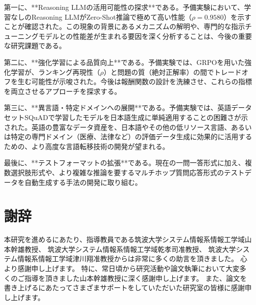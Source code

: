 \documentclass[a4paper,11pt]{jreport}
\begin{document}
第一に、**Reasoning LLMの活用可能性の探求**である。予備実験において、学習なしのReasoning LLMがZero-Shot推論で極めて高い性能（$\rho = 0.9580$）を示すことが確認された。この現象の背景にあるメカニズムの解明や、専門的な指示チューニングモデルとの性能差が生まれる要因を深く分析することは、今後の重要な研究課題である。

第二に、**強化学習による品質向上**である。予備実験では、GRPOを用いた強化学習が、ランキング再現性（$\rho$）と問題の質（絶対正解率）の間でトレードオフを生む可能性が示唆された。今後は報酬関数の設計を洗練させ、これらの指標を両立させるアプローチを探求する。

第三に、**異言語・特定ドメインへの展開**である。予備実験では、英語データセットSQuADで学習したモデルを日本語生成に単純適用することの困難さが示された。英語の豊富なデータ資産を、日本語やその他の低リソース言語、あるいは特定の専門ドメイン（医療、法律など）の評価データ生成に効果的に活用するための、より高度な言語転移技術の開発が望まれる。

最後に、**テストフォーマットの拡張**である。現在の一問一答形式に加え、複数選択肢形式や、より複雑な推論を要するマルチホップ質問応答形式のテストデータを自動生成する手法の開発に取り組む。

\chapter*{謝辞}
本研究を進めるにあたり、指導教員である筑波大学システム情報系情報工学域山本幹雄教授、
筑波大学システム情報系情報工学域乾孝司准教授、
筑波大学システム情報系情報工学域津川翔准教授からは非常に多くの助言を頂きました。
心より感謝申し上げます。
特に、常日頃から研究活動や論文執筆において大変多くのご指導を頂きました山本幹雄教授に深く感謝申し上げます。
また、論文を書き上げるにあたってさまざまサポートをしていただいた研究室の皆様に感謝申し上げます。

\newpage
{}
\renewcommand{\bibname}{参考文献}
\end{document}
